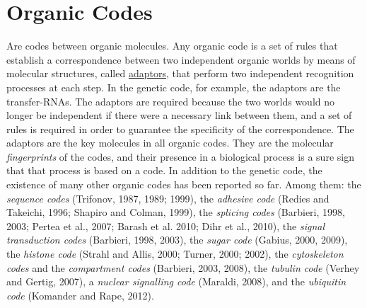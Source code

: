 \documentclass[12pt]{article}
\begin{document}
\section{Organic Codes}
Are codes between organic molecules. Any organic code is a set of rules that establish a correspondence between two independent organic worlds by means of molecular structures, called \hyperlink{adaptor}{adaptors}, that perform two independent recognition processes at each step. In the genetic code, for example, the adaptors are the transfer-RNAs. The adaptors are required because the two worlds would no longer be independent if there were a necessary link between them, and a set of rules is required in order to guarantee the specificity of the correspondence. The adaptors are the key molecules in all organic codes. They are the molecular \textit{fingerprints} of the codes, and their presence in a biological process is a sure sign that that process is based on a code. In addition to the genetic code, the existence of many other organic codes has been reported so far. Among them: the \textit{sequence codes} (Trifonov, 1987, 1989; 1999), the \textit{adhesive code} (Redies and Takeichi, 1996; Shapiro and Colman, 1999), the \textit{splicing codes} (Barbieri, 1998, 2003; Pertea et al., 2007; Barash et al. 2010; Dihr et al., 2010), the \textit{signal transduction codes} (Barbieri, 1998, 2003), the \textit{sugar code} (Gabius, 2000, 2009), the \textit{histone code} (Strahl and Allis, 2000; Turner, 2000; 2002), the \textit{cytoskeleton codes} and the \textit{compartment codes} (Barbieri, 2003, 2008), the \textit{tubulin code} (Verhey and Gertig, 2007), a \textit{nuclear signalling code} (Maraldi, 2008), and the \textit{ubiquitin code} (Komander and Rape, 2012). 
\end{document}
